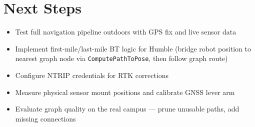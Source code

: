 \documentclass[11pt,a4paper]{article}
\begin{document}
\section{Next Steps}

\begin{itemize}[noitemsep]
    \item Test full navigation pipeline outdoors with GPS fix and live sensor data
    \item Implement first-mile/last-mile BT logic for Humble (bridge robot position to nearest graph node via \texttt{ComputePathToPose}, then follow graph route)
    \item Configure NTRIP credentials for RTK corrections
    \item Measure physical sensor mount positions and calibrate GNSS lever arm
    \item Evaluate graph quality on the real campus --- prune unusable paths, add missing connections
\end{itemize}
\end{document}
